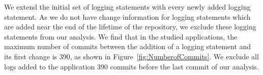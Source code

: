 We extend the initial set of logging statements with every newly added logging statement. 
As we do not have change information for logging statements which are added near the end of the lifetime of the repository, we exclude these logging statements from our analysis. We find that in the studied applications, the maximum number of commits between the addition of a logging statement and its first change is 390, as shown in Figure~\ref{fig:NumberofCommits}. We exclude all logs added to the application 390 commits before the last commit of our analysis. 











